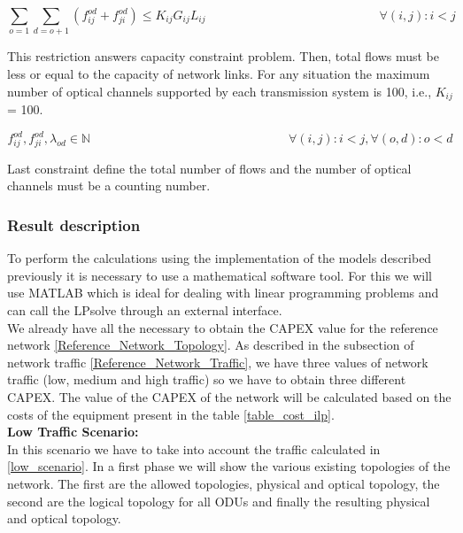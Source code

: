 \begin{equation}
\sum_{o=1} \sum_{d=o+1} \left(f_{ij}^{od} + f_{ji}^{od}\right) \leq K_{ij} G_{ij} L_{ij} \qquad \qquad \qquad \qquad \qquad \qquad \qquad
\forall(i,j) : i < j
\label{ILPTransp4_surv}
\end{equation}

This restriction answers capacity constraint problem. Then, total flows must be less or equal to the capacity of network links. For any situation the maximum number of optical channels supported by each transmission system is 100, i.e., $K_{ij}$ = 100.

\begin{equation}
f_{ij}^{od} , f_{ji}^{od} , \lambda_{od} \in \mathbb{N}   \qquad \qquad \qquad \qquad \qquad \qquad \qquad \qquad
\forall(i,j) : i < j, \forall(o,d) : o < d
\label{ILPTransp5_surv}
\end{equation}

Last constraint define the total number of flows and the number of optical channels must be a counting number.\\


\subsubsection{Result description}

To perform the calculations using the implementation of the models described previously it is necessary to use a mathematical software tool. For this we will use MATLAB which is ideal for dealing with linear programming problems and can call the LPsolve through an external interface.\\
We already have all the necessary to obtain the CAPEX value for the reference network \ref{Reference_Network_Topology}. As described in the subsection of network traffic \ref{Reference_Network_Traffic}, we have three values of network traffic (low, medium and high traffic) so we have to obtain three different CAPEX.
The value of the CAPEX of the network will be calculated based on the costs of the equipment present in the table \ref{table_cost_ilp}.\\


\textbf{Low Traffic Scenario:}\\

In this scenario we have to take into account the traffic calculated in \ref{low_scenario}. In a first phase we will show the various existing topologies of the network. The first are the allowed topologies, physical and optical topology, the second are the logical topology for all ODUs and finally the resulting physical and optical topology.\\


